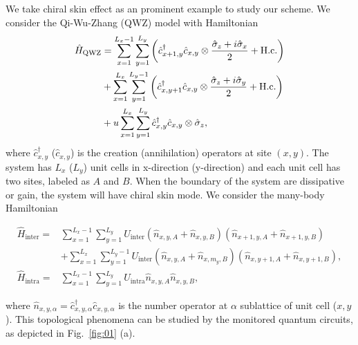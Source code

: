 \documentclass[longbibliography, aps, prx, amsmath, amssymb, amsfonts, twocolumn,superscriptaddress, footinbib]{revtex4-1}
\begin{document}
	We take chiral skin effect as an prominent example to study our scheme. We consider the Qi-Wu-Zhang (QWZ) model with Hamiltonian
	\begin{align}
		\hat{H}_{\text{QWZ}} &=  \sum_{{x}=1}^{L_{x}-1} \sum_{{y}=1}^{L_{y}}\left(\hat{c}_{{x}+1, {y}}^{\dagger} \hat{c}_{{x}, {y}} \otimes \frac{\hat{\sigma}_{z}+i \hat{\sigma}_{x}}{2}+\mathrm{H.c.}\right) \notag\\
		& +\sum_{{x}=1}^{L_{x}} \sum_{{y}=1}^{L_{y}-1}\left(\hat{c}_{{x}, {y}+1}^{\dagger} \hat{c}_{{x}, {y}} \otimes \frac{\hat{\sigma}_{z}+i \hat{\sigma}_{y}}{2}+\mathrm{H.c.}\right) \notag\\
		& +u \sum_{{x}=1}^{L_{x}} \sum_{{y}=1}^{L_{y}} \hat{c}_{{x}, {y}}^{\dagger} \hat{c}_{{x}, {y}} \otimes \hat{\sigma}_{z},
	\end{align}
	where $\hat{c}_{{x}, {y}}^{\dagger}$ ($\hat{c}_{{x}, {y}}$) is the creation (annihilation) operators at site $({x},{y})$. The system has $L_x$ ($L_y$) unit cells in x-direction (y-direction) and each unit cell has two sites, labeled as $A$ and $B$. 
	When the boundary of the system are dissipative or gain, the system will have chiral skin mode. 
	We consider the many-body Hamiltonian
	\begin{widetext}
		\begin{align}
			\hat{H}_{\text{inter}} = &\sum_{{x}=1}^{L_{x}-1} \sum_{{y}=1}^{L_{y}}  U_{\text{inter}} \left(\hat{n}_{{x}, {y}, A}+\hat{n}_{{x}, {y}, B}\right) \left(\hat{n}_{{x}+1, {y}, A}+\hat{n}_{{x}+1, {y}, B}\right)\\
			& + 
			\sum_{{x}=1}^{L_{x}} \sum_{{y}=1}^{L_{y}-1}  U_{\text{inter}} \left(\hat{n}_{{x}, {y}, A}+\hat{n}_{{x}, m_y, B}\right) \left(\hat{n}_{{x}, {y}+1, A}+\hat{n}_{{x}, {y}+1, B}\right),\\
			\hat{H}_{\text{intra}} =& \sum_{{x}=1}^{L_{x}-1} \sum_{{y}=1}^{L_{y}}  U_{\text{intra}} \hat{n}_{{x}, {y}, A} \hat{n}_{{x}, {y}, B},
		\end{align}
	\end{widetext}
	where $\hat{n}_{{x},{y},\alpha}=\hat{c}_{x,y,\alpha}^{\dagger}\hat{c}_{x,y,\alpha}$ is the number operator at $\alpha$ sublattice of unit cell (${x},{y}$).
	This topological phenomena can be studied by the monitored quantum circuits, as depicted in Fig.~\ref{fig:01} (a). 
\end{document}
